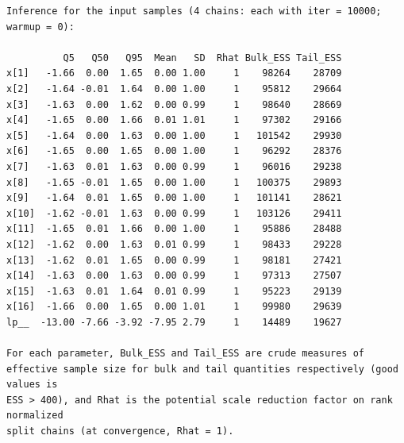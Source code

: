 \documentclass[american,]{article}
\begin{document}
\begin{verbatim}
Inference for the input samples (4 chains: each with iter = 10000; warmup = 0):

          Q5   Q50   Q95  Mean   SD  Rhat Bulk_ESS Tail_ESS
x[1]   -1.66  0.00  1.65  0.00 1.00     1    98264    28709
x[2]   -1.64 -0.01  1.64  0.00 1.00     1    95812    29664
x[3]   -1.63  0.00  1.62  0.00 0.99     1    98640    28669
x[4]   -1.65  0.00  1.66  0.01 1.01     1    97302    29166
x[5]   -1.64  0.00  1.63  0.00 1.00     1   101542    29930
x[6]   -1.65  0.00  1.65  0.00 1.00     1    96292    28376
x[7]   -1.63  0.01  1.63  0.00 0.99     1    96016    29238
x[8]   -1.65 -0.01  1.65  0.00 1.00     1   100375    29893
x[9]   -1.64  0.01  1.65  0.00 1.00     1   101141    28621
x[10]  -1.62 -0.01  1.63  0.00 0.99     1   103126    29411
x[11]  -1.65  0.01  1.66  0.00 1.00     1    95886    28488
x[12]  -1.62  0.00  1.63  0.01 0.99     1    98433    29228
x[13]  -1.62  0.01  1.65  0.00 0.99     1    98181    27421
x[14]  -1.63  0.00  1.63  0.00 0.99     1    97313    27507
x[15]  -1.63  0.01  1.64  0.01 0.99     1    95223    29139
x[16]  -1.66  0.00  1.65  0.00 1.01     1    99980    29639
lp__  -13.00 -7.66 -3.92 -7.95 2.79     1    14489    19627

For each parameter, Bulk_ESS and Tail_ESS are crude measures of 
effective sample size for bulk and tail quantities respectively (good values is 
ESS > 400), and Rhat is the potential scale reduction factor on rank normalized
split chains (at convergence, Rhat = 1).
\end{verbatim}
\end{document}
